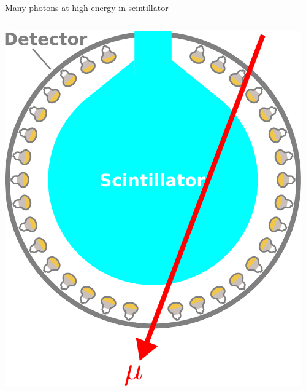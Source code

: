 \documentclass[14pt]{beamer}
\begin{document}
\begin{frame}{Many photons at high energy in scintillator}
	\begin{columns}[T]
		\begin{block}{}
			\includegraphics[width=\linewidth]{through_going_muon-with_scintillator.pdf}
		\end{block}
		\begin{block}{}
\end{block}
\end{columns}
\end{frame}
\end{document}
